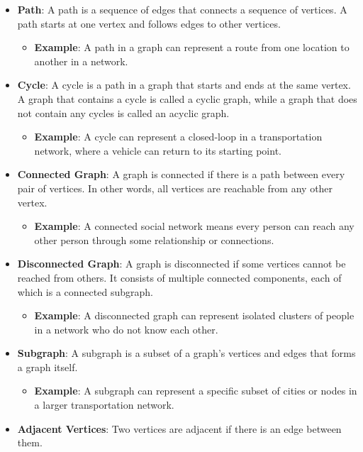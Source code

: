 \documentclass{book}
\begin{document}
\begin{itemize}
    \item \textbf{Path}: A path is a sequence of edges that connects a sequence of vertices. A path starts at one vertex and follows edges to other vertices.
    \begin{itemize}
        \item \textbf{Example}: A path in a graph can represent a route from one location to another in a network.
    \end{itemize}
    \item \textbf{Cycle}: A cycle is a path in a graph that starts and ends at the same vertex. A graph that contains a cycle is called a cyclic graph, while a graph that does not contain any cycles is called an acyclic graph.
    \begin{itemize}
        \item \textbf{Example}: A cycle can represent a closed-loop in a transportation network, where a vehicle can return to its starting point.
    \end{itemize}
    \item \textbf{Connected Graph}: A graph is connected if there is a path between every pair of vertices. In other words, all vertices are reachable from any other vertex.
    \begin{itemize}
        \item \textbf{Example}: A connected social network means every person can reach any other person through some relationship or connections.
    \end{itemize}
    \item \textbf{Disconnected Graph}: A graph is disconnected if some vertices cannot be reached from others. It consists of multiple connected components, each of which is a connected subgraph.
    \begin{itemize}
        \item \textbf{Example}: A disconnected graph can represent isolated clusters of people in a network who do not know each other.
    \end{itemize}
    \item \textbf{Subgraph}: A subgraph is a subset of a graph's vertices and edges that forms a graph itself.
    \begin{itemize}
        \item \textbf{Example}: A subgraph can represent a specific subset of cities or nodes in a larger transportation network.
    \end{itemize}
    \item \textbf{Adjacent Vertices}: Two vertices are adjacent if there is an edge between them.

\end{itemize}
\end{document}
